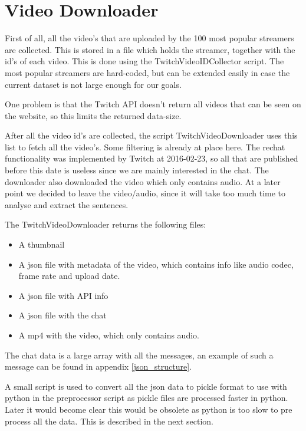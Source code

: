 \documentclass[final]{report}
\begin{document}
\section{Video Downloader}
First of all, all the video's that are uploaded by the 100 most popular streamers are collected. This is stored in a file which holds the streamer, together with the id's of each video.
This is done using the TwitchVideoIDCollector script. The most popular streamers are hard-coded, but can be extended easily in case the current dataset is not large enough for our goals.

One problem is that the Twitch API doesn't return all videos that can be seen on the website, so this limits the returned data-size.

After all the video id's are collected, the script TwitchVideoDownloader uses this list to fetch all the video's.
Some filtering is already at place here. The rechat functionality was implemented by Twitch at 2016-02-23, so all that are published before this date is useless since we are mainly interested in the chat.
The downloader also downloaded the video which only contains audio. At a later point we decided to leave the video/audio, since it will take too much time to analyse and extract the sentences.

The TwitchVideoDownloader returns the following files:
\begin{itemize}
\item A thumbnail
\item A json file with metadata of the video, which contains info like audio codec, frame rate and upload date.
\item A json file with API info
\item A json file with the chat
\item A mp4 with the video, which only contains audio.
\end{itemize}

The chat data is a large array with all the messages, an example of such a message can be found in appendix \ref{json_structure}.

A small script is used to convert all the json data to pickle format to use with python in the preprocessor script as pickle files are processed faster in python. Later it would become clear this would be obsolete as python is too slow to pre process all the data. This is described in the next section.
\end{document}

